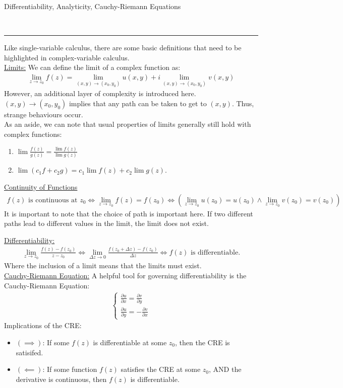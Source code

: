 \documentclass{article}
\newcommand{\header}[1]{\begin{large}\noindent #1\end{large}\\\rule{\textwidth}{0.5pt}}
\newcommand{\gap}{\medskip\\}
\newcommand{\sheader}[1]{\underline{#1:}}
\newcommand{\ds}{\displaystyle}
\begin{document}
    \header{Differentiability, Analyticity, Cauchy-Riemann Equations}
    Like single-variable calculus, there are some basic definitions that need to 
    be highlighted in complex-variable calculus.
    \gap
    \sheader{Limits}
    We can define the limit of a complex function as:
    \begin{align*}
        \lim_{z \to z_0} f(z) = \lim_{(x, y) \to (x_0, y_0)}u(x, y) + i \lim_{(x, y) \to (x_0, y_0)}v(x, y)
    \end{align*}
    However, an additional layer of complexity is introduced here. $(x, y) \to (x_0, y_0)$
    implies that any path can be taken to get to $(x,y)$. Thus, strange behaviours occur.
    \gap
    As an aside, we can note that usual properties of limits generally still hold 
    with complex functions:
    \begin{enumerate}
        \item $\ds \lim \frac{f(z)}{g(z)} = \frac{\lim f(z)}{\lim g(z)}$
        \item $\lim(c_1 f + c_2 g) = c_1 \lim f(z) + c_2 \lim g(z)$.
    \end{enumerate}
    \underline{Continuity of Functions}
    \begin{align*}
        f(z) \textrm{ is continuous at }z_0 \iff \lim_{z \to z_0} f(z) = f(z_0) \iff \left(\lim_{z \to z_0} u(z_0) = u(z_0) \wedge \lim_{z \to z_0} v(z_0) = v(z_0)\right)
    \end{align*}
    It is important to note that the choice of path is important here. 
    If two different paths lead to different values in the limit, the limit does not 
    exist.
    
    \sheader{Differentiability}
    \begin{align*}
        \lim_{z \to z_0} \frac{f(z) - f(z_0)}{z - z_0} \iff \lim_{\Delta z \to 0} \frac{f(z_0 + \Delta z) - f(z_0)}{\Delta z} \iff f(z) \textrm{ is differentiable.}
    \end{align*}
    Where the inclusion of a limit means that the limits must exist.
    \gap
    \sheader{Cauchy-Riemann Equation}
    A helpful tool for governing differentiability is the Cauchy-Riemann Equation:
    \begin{align*}
        \begin{cases}
            \frac{\partial u}{\partial x} = \frac{\partial v}{\partial y}\\
            \frac{\partial u}{\partial y} = -\frac{\partial v}{\partial x}
        \end{cases}
    \end{align*}
    Implications of the CRE:
    \begin{itemize}
        \item $(\implies)$: If some $f(z)$ is differentiable at some $z_0$, then 
        the CRE is satisifed.
        \item $(\impliedby)$: If some function $f(z)$ satisfies the CRE at some $z_0$,
        AND the derivative is continuous, then $f(z)$ is differentiable.
    \end{itemize}
\end{document}
